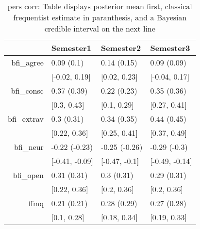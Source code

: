 \begin{table}[ht]
\centering
\begin{tabular}{rlll}
  \hline
 & Semester1 & Semester2 & Semester3 \\ 
  \hline
bfi\_agree & 0.09 (0.1) & 0.14 (0.15) & 0.09 (0.09) \\ 
   & [-0.02, 0.19] & [0.02, 0.23] & [-0.04, 0.17] \\ 
  bfi\_consc & 0.37 (0.39) & 0.22 (0.23) & 0.35 (0.36) \\ 
     & [0.3, 0.43] & [0.1, 0.29] & [0.27, 0.41] \\ 
  bfi\_extrav & 0.3 (0.31) & 0.34 (0.35) & 0.44 (0.45) \\ 
       & [0.22, 0.36] & [0.25, 0.41] & [0.37, 0.49] \\ 
  bfi\_neur & -0.22 (-0.23) & -0.25 (-0.26) & -0.29 (-0.3) \\ 
         & [-0.41, -0.09] & [-0.47, -0.1] & [-0.49, -0.14] \\ 
  bfi\_open & 0.31 (0.31) & 0.3 (0.31) & 0.29 (0.31) \\ 
           & [0.22, 0.36] & [0.2, 0.36] & [0.2, 0.36] \\ 
  ffmq & 0.21 (0.21) & 0.28 (0.29) & 0.27 (0.28) \\ 
             & [0.1, 0.28] & [0.18, 0.34] & [0.19, 0.33] \\ 
   \hline
\end{tabular}
\caption{pers corr: Table displays posterior mean first, classical frequentist estimate in paranthesis, and a Bayesian credible interval on the next line} 
\label{pers_corr}
\end{table}
